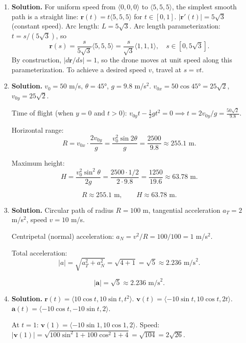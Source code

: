 \begin{enumerate}
\item \textbf{Solution.}
For uniform speed from $\langle 0,0,0\rangle$ to $\langle 5,5,5\rangle$, the simplest smooth path is a straight line:
$\mathbf{r}(t)=t\langle 5,5,5\rangle$ for $t\in[0,1]$.
$|\mathbf{r}'(t)|=5\sqrt{3}$ (constant speed). Arc length: $L=5\sqrt{3}$.
Arc length parameterization: $t=s/(5\sqrt{3})$, so
\[
\boxed{\mathbf{r}(s)=\frac{s}{5\sqrt{3}}\langle 5,5,5\rangle = \frac{s}{\sqrt{3}}\langle 1,1,1\rangle, \quad s\in[0, 5\sqrt{3}].}
\]
By construction, $|d\mathbf{r}/ds|=1$, so the drone moves at unit speed along this parameterization. To achieve a desired speed $v$, travel at $s=vt$.


\item \textbf{Solution.}
$v_0=50$ m/s, $\theta=45°$, $g=9.8$ m/s$^2$.
$v_{0x}=50\cos 45°=25\sqrt{2}$, $v_{0y}=25\sqrt{2}$.

Time of flight (when $y=0$ and $t>0$): $v_{0y}t-\frac{1}{2}gt^2=0 \implies t=2v_{0y}/g=\frac{50\sqrt{2}}{9.8}$.

Horizontal range:
\[
R = v_{0x}\cdot\frac{2v_{0y}}{g}=\frac{v_0^2\sin 2\theta}{g}=\frac{2500}{9.8}\approx 255.1\text{ m}.
\]

Maximum height:
\[
H = \frac{v_0^2\sin^2\theta}{2g}=\frac{2500\cdot 1/2}{2\cdot 9.8}=\frac{1250}{19.6}\approx 63.78\text{ m}.
\]

\[
\boxed{R\approx 255.1\text{ m},\qquad H\approx 63.78\text{ m}.}
\]

\item \textbf{Solution.}
Circular path of radius $R=100$ m, tangential acceleration $a_T=2$ m/s$^2$, speed $v=10$ m/s.

Centripetal (normal) acceleration: $a_N=v^2/R=100/100=1$ m/s$^2$.

Total acceleration:
\[
|a|=\sqrt{a_T^2+a_N^2}=\sqrt{4+1}=\sqrt{5}\approx 2.236\text{ m/s}^2.
\]

\[
\boxed{|\mathbf{a}|=\sqrt{5}\approx 2.236\text{ m/s}^2.}
\]

\item \textbf{Solution.}
$\mathbf{r}(t)=\langle 10\cos t, 10\sin t, t^2\rangle$.
$\mathbf{v}(t)=\langle -10\sin t, 10\cos t, 2t\rangle$.
$\mathbf{a}(t)=\langle -10\cos t, -10\sin t, 2\rangle$.

At $t=1$:
$\mathbf{v}(1)=\langle -10\sin 1, 10\cos 1, 2\rangle$.
Speed: $|\mathbf{v}(1)|=\sqrt{100\sin^2 1+100\cos^2 1+4}=\sqrt{104}=2\sqrt{26}$.


\end{enumerate}
